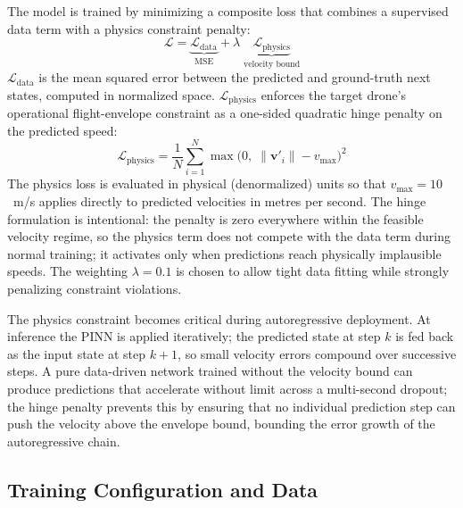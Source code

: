 \documentclass[11pt,letterpaper]{article}
\begin{document}
The model is trained by minimizing a composite loss that combines a
supervised data term with a physics constraint penalty:
\begin{equation}
    \mathcal{L}
        = \underbrace{\mathcal{L}_{\mathrm{data}}}_{\text{MSE}}
        + \lambda\;\underbrace{\mathcal{L}_{\mathrm{physics}}}_{\text{velocity bound}}
    \label{eq:total_loss}
\end{equation}
$\mathcal{L}_{\mathrm{data}}$ is the mean squared error between the predicted
and ground-truth next states, computed in normalized space.
$\mathcal{L}_{\mathrm{physics}}$ enforces the target drone's operational
flight-envelope constraint as a one-sided quadratic hinge penalty on the
predicted speed:
\begin{equation}
    \mathcal{L}_{\mathrm{physics}}
        = \frac{1}{N}\sum_{i=1}^{N}
          \max\!\bigl(0,\;\|\mathbf{v}'_i\| - v_{\max}\bigr)^{2}
    \label{eq:phys_loss}
\end{equation}
The physics loss is evaluated in physical (denormalized) units so that
$v_{\max} = 10$~m/s applies directly to predicted velocities in metres per
second.
The hinge formulation is intentional: the penalty is zero everywhere within
the feasible velocity regime, so the physics term does not compete with the
data term during normal training; it activates only when predictions reach
physically implausible speeds.
The weighting $\lambda = 0.1$ is chosen to allow tight data fitting while
strongly penalizing constraint violations.

The physics constraint becomes critical during autoregressive deployment.
At inference the PINN is applied iteratively; the predicted state at step
$k$ is fed back as the input state at step $k{+}1$, so small velocity
errors compound over successive steps.
A pure data-driven network trained without the velocity bound can produce
predictions that accelerate without limit across a multi-second dropout; the
hinge penalty prevents this by ensuring that no individual prediction step
can push the velocity above the envelope bound, bounding the error growth
of the autoregressive chain.

\subsection{Training Configuration and Data}
\label{sec:pinn_data}
\end{document}
